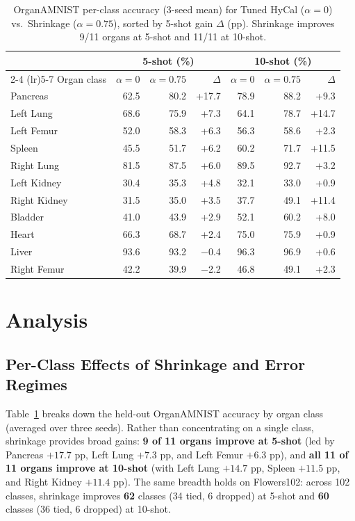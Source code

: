 \documentclass[letterpaper]{article} %
\begin{document}
\begin{table}[t]
\centering
\footnotesize
\setlength{\tabcolsep}{2.5pt}
\begin{tabular}{@{}lrrrrrr@{}}
\toprule
 & \multicolumn{3}{c}{5-shot (\%)} & \multicolumn{3}{c}{10-shot (\%)} \\
\cmidrule(lr){2-4} \cmidrule(lr){5-7}
Organ class & $\alpha{=}0$ & $\alpha{=}0.75$ & $\Delta$ & $\alpha{=}0$ & $\alpha{=}0.75$ & $\Delta$ \\
\midrule
Pancreas & 62.5 & 80.2 & +17.7 & 78.9 & 88.2 & +9.3 \\
Left Lung & 68.6 & 75.9 & +7.3 & 64.1 & 78.7 & +14.7 \\
Left Femur & 52.0 & 58.3 & +6.3 & 56.3 & 58.6 & +2.3 \\
Spleen & 45.5 & 51.7 & +6.2 & 60.2 & 71.7 & +11.5 \\
Right Lung & 81.5 & 87.5 & +6.0 & 89.5 & 92.7 & +3.2 \\
Left Kidney & 30.4 & 35.3 & +4.8 & 32.1 & 33.0 & +0.9 \\
Right Kidney & 31.5 & 35.0 & +3.5 & 37.7 & 49.1 & +11.4 \\
Bladder & 41.0 & 43.9 & +2.9 & 52.1 & 60.2 & +8.0 \\
Heart & 66.3 & 68.7 & +2.4 & 75.0 & 75.9 & +0.9 \\
Liver & 93.6 & 93.2 & $-$0.4 & 96.3 & 96.9 & +0.6 \\
Right Femur & 42.2 & 39.9 & $-$2.2 & 46.8 & 49.1 & +2.3 \\
\bottomrule
\end{tabular}
\caption{OrganAMNIST per-class accuracy (3-seed mean) for Tuned HyCal ($\alpha=0$) vs.\ Shrinkage ($\alpha=0.75$), sorted by 5-shot gain $\Delta$ (pp). Shrinkage improves 9/11 organs at 5-shot and 11/11 at 10-shot.}
\label{tab:organ_perclass}
\end{table}

\section{Analysis}

\subsection{Per-Class Effects of Shrinkage and Error Regimes}

Table~\ref{tab:organ_perclass} breaks down the held-out OrganAMNIST accuracy by organ class (averaged over three seeds). Rather than concentrating on a single class, shrinkage provides broad gains: \textbf{9 of 11 organs improve at 5-shot} (led by Pancreas $+17.7$ pp, Left Lung $+7.3$ pp, and Left Femur $+6.3$ pp), and \textbf{all 11 of 11 organs improve at 10-shot} (with Left Lung $+14.7$ pp, Spleen $+11.5$ pp, and Right Kidney $+11.4$ pp). The same breadth holds on Flowers102: across 102 classes, shrinkage improves \textbf{62} classes (34 tied, 6 dropped) at 5-shot and \textbf{60} classes (36 tied, 6 dropped) at 10-shot.
\end{document}
